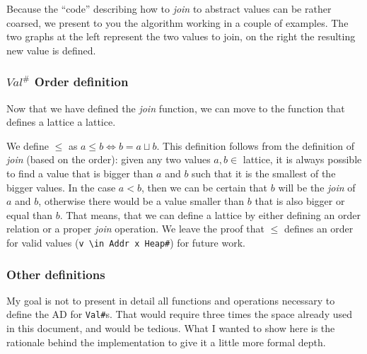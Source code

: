 Because the \enquote{code} describing how to \emph{join} to abstract
values can be rather coarsed, we present to you the algorithm working in
a couple of examples. The two graphs at the left represent the two
values to join, on the right the resulting new value is defined.

{}

{}

\subsubsection*{\(Val^\#\) Order definition}

Now that we have defined the \emph{join} function, we can move to the
function that defines a lattice a lattice.

We define \(\le{}\) as \(a \le b \iff b = a \sqcup b\). This definition
follows from the definition of \emph{join} (based on the order): given
any two values \(a,b \in\) lattice, it is always possible to find a
value that is bigger than \(a\) and \(b\) such that it is the smallest
of the bigger values. In the case \(a < b\), then we can be certain that
\(b\) will be the \emph{join} of \(a\) and \(b\), otherwise there would
be a value smaller than \(b\) that is also bigger or equal than \(b\).
That means, that we can define a lattice by either defining an order
relation or a proper \emph{join} operation. We leave the proof that
\(\le{}\) defines an order for valid values
(\texttt{v\ \textbackslash{}in\ Addr\ x\ Heap\#}) for future work.

\subsubsection*{Other definitions}

My goal is not to present in detail all functions and operations
necessary to define the AD for \texttt{Val\#}s. That would require three
times the space already used in this document, and would be tedious.
What I wanted to show here is the rationale behind the implementation to
give it a little more formal depth.

